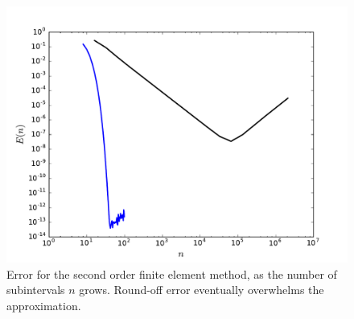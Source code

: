 \begin{figure}[ht]
\centering
\includegraphics[width=\textwidth]{FEM_error_2nd_order.pdf}
\caption{Error for the second order finite element method, as the number of subintervals $n$ grows. Round-off error eventually overwhelms the approximation. }
\label{fig:FEM_error_2nd_order}
\end{figure}
\newpage
